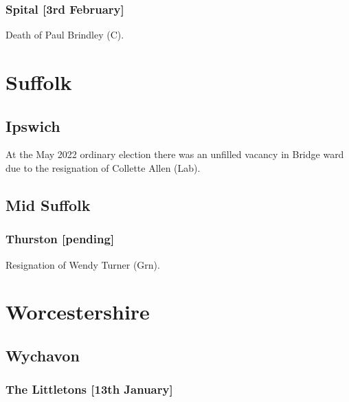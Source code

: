 \documentclass[a4paper,openany]{book}
\begin{document}
\begin{resultsiii}
\subsubsection*{Spital \hspace*{\fill}\nolinebreak[1]%
	\enspace\hspace*{\fill}
	[3rd February]}


Death of Paul Brindley (C).

\section{Suffolk}

\subsection*{Ipswich}

At the May 2022 ordinary election there was an unfilled vacancy in Bridge ward due to the resignation of Collette Allen (Lab).%

\subsection*{Mid Suffolk}

\subsubsection*{Thurston \hspace*{\fill}\nolinebreak[1]%
	\enspace\hspace*{\fill}
	[pending]}


Resignation of Wendy Turner (Grn).

\section{Worcestershire}

\subsection*{Wychavon}

\subsubsection*{The Littletons \hspace*{\fill}\nolinebreak[1]%
	\enspace\hspace*{\fill}
	[13th January]}


\end{resultsiii}
\end{document}
